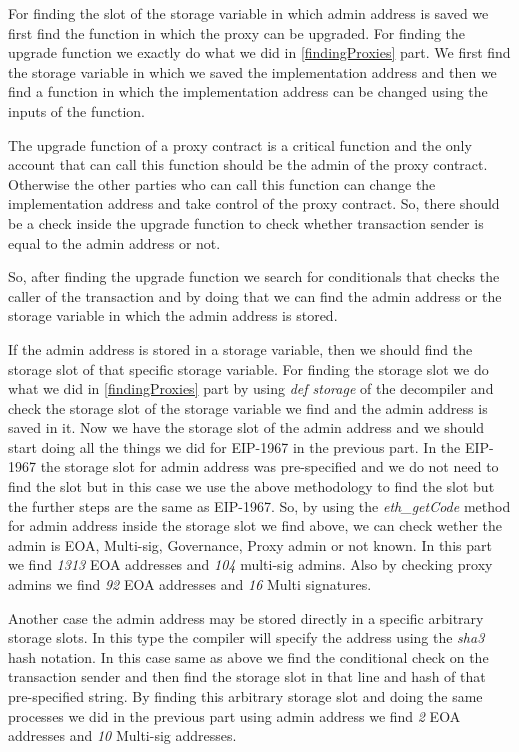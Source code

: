 For finding the slot of the storage variable in which admin address is saved we first find the function in which the proxy can be upgraded. For finding the upgrade function we exactly do what we did in \ref{findingProxies} part. We first find the storage variable in which we saved the implementation address and then we find a function in which the implementation address can be changed using the inputs of the function. 

The upgrade function of a proxy contract is a critical function and the only account that can call this function should be the admin of the proxy contract. Otherwise the other parties who can call this function can change the implementation address and take control of the proxy contract. So, there should be a check inside the upgrade function to check whether transaction sender is equal to the admin address or not.

So, after finding the upgrade function we search for conditionals that checks the caller of the transaction and by doing that we can find the admin address or the storage variable in which the admin address is stored.


If the admin address is stored in a storage variable, then we should find the storage slot of that specific storage variable. For finding the storage slot we do what we did in \ref{findingProxies} part by using \textit{def storage} of the decompiler and check the storage slot of the storage variable we find and the admin address is saved in it. Now we have the storage slot of the admin address and we should start doing all the things we did for EIP-1967 in the previous part. In the EIP-1967 the storage slot for admin address was pre-specified and we do not need to find the slot but in this case we use the above methodology to find the slot but the further steps are the same as EIP-1967.
So, by using the \textit{eth\_getCode} method for admin address inside the storage slot we find above, we can check wether the admin is EOA, Multi-sig, Governance, Proxy admin or not known.
In this part we find \textit{1313} EOA addresses and \textit{104} multi-sig admins. Also by checking proxy admins we find \textit{92} EOA addresses and \textit{16} Multi signatures. 


Another case the admin address may be stored directly in a specific arbitrary storage slots. In this type the compiler will specify the address using the \textit{sha3} hash notation. In this case same as above we find the conditional check on the transaction sender and then find the storage slot in that line and hash of that pre-specified string. 
By finding this arbitrary storage slot and doing the same processes we did in the previous part using admin address we find \textit{2} EOA addresses and \textit{10} Multi-sig addresses.

